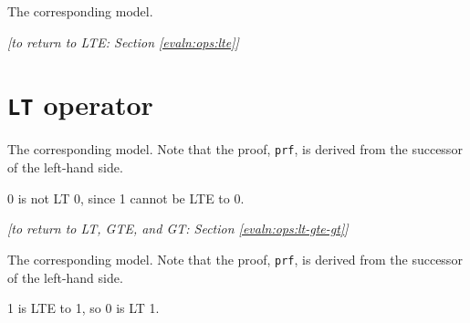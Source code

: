     
    
    
    The corresponding \Idris model.
    \\
    
    \begin{flushright}
        \textit{[to return to LTE: Section \ref{evaln:ops:lte}]}
    \end{flushright}
    
    \newpage

\newpage


\section{\texttt{LT} operator}\label{app:evaln:ops:lt}
    
    
    
    The corresponding \Idris model. Note that the proof, \texttt{prf}, is derived from the successor of the left-hand side.
    
    
    0 is not LT 0, since 1 cannot be LTE to 0.
    \\
    
    \begin{flushright}
        \textit{[to return to LT, GTE, and GT: Section \ref{evaln:ops:lt-gte-gt}]}
    \end{flushright}
    
    \newpage
    
    
    
    
    The corresponding \Idris model. Note that the proof, \texttt{prf}, is derived from the successor of the left-hand side.
    
    
    1 is LTE to 1, so 0 is LT 1.
    \\
    
